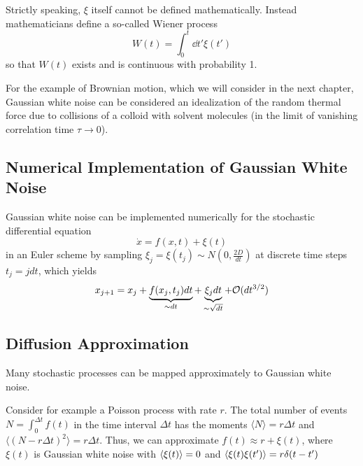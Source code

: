 \documentclass{notebook}
\begin{document}
\begin{remark}
	Strictly speaking, $\xi$ itself cannot be defined mathematically. Instead mathematicians define a so-called Wiener process 
	\begin{equation}
	W(t) = \int_0^t{\dd{t'} \xi(t')}
	\end{equation}
	so that $W(t)$ exists and is continuous with probability 1.
\end{remark}

For the example of Brownian motion, which we will consider in the next chapter, Gaussian white noise can be considered an idealization of the random thermal force due to collisions of a colloid with solvent molecules (in the limit of vanishing correlation time $\tau \to 0$). 


\subsection*{Numerical Implementation of Gaussian White Noise}

Gaussian white noise can be implemented numerically for the stochastic differential equation
%
\begin{equation}
	\dot{x} = f(x,t) + \xi(t)
\end{equation}
%
in an Euler scheme by sampling $\xi_j = \xi(t_j) \sim N(0, \frac{2D}{dt})$ at discrete time steps $t_j = j dt$, which yields 
%
\begin{equation}
	x_{j+1} = x_j + \underbrace{f(x_j, t_j) dt}_{\sim dt} + \underbrace{\xi_j dt}_{\sim \sqrt{dt}} + \mathcal{O}(dt^{3/2})
\end{equation}
%

\subsection*{Diffusion Approximation}

Many stochastic processes can be mapped approximately to Gaussian white noise. 

Consider for example a Poisson process with rate $r$. The total number of events $N = \int_0^{\Delta t} f(t)$ in the time interval $\Delta t$ has the moments $\langle N \rangle = r \Delta t$ and $\langle (N - r \Delta t)^2 \rangle = r \Delta t$. Thus, we can approximate $f(t) \approx r + \xi(t)$, where $\xi(t)$ is Gaussian white noise with $\expval{\xi(t)} = 0$ and $\expval{\xi(t) \xi(t')} = r \delta(t-t^\prime)$
\end{document}
